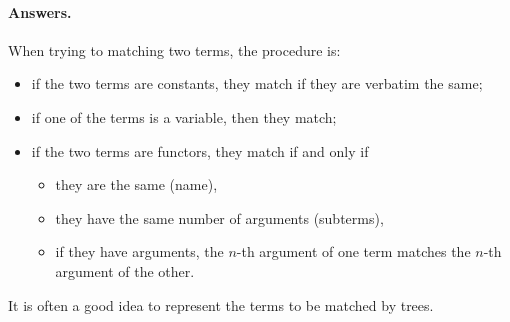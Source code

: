 \paragraph{Answers.} When trying to matching two terms, the procedure
is:
\begin{itemize}

  \item if the two terms are constants, they match if they are
    verbatim the same;

  \item if one of the terms is a variable, then they match;

  \item if the two terms are functors, they match if and only if 
  \begin{itemize}

    \item they are the same (name),
 
    \item they have the same number of arguments (subterms),

    \item if they have arguments, the \(n\)-th argument of one term
      matches the \(n\)-th argument of the other.

  \end{itemize}
    
\end{itemize}
\noindent It is often a good idea to represent the terms to be matched
by trees.


